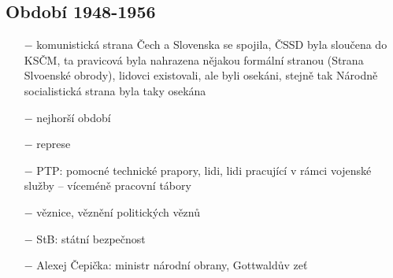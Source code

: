 \documentclass{article}
\begin{document}
\subsection*{Období 1948-1956}
\begin{itemize}
    \vspace{-0.5em}
    \setlength\itemsep{0.15em}
    \item[$-$] komunistická strana Čech a Slovenska se spojila, ČSSD byla sloučena do KSČM, ta pravicová byla nahrazena nějakou formální stranou (Strana Slvoenské obrody), lidovci existovali, ale byli osekáni, stejně tak Národně socialistická strana byla taky osekána
    \item[$-$] nejhorší období
    \item[$-$] represe
    \item[$-$] PTP: pomocné technické prapory, lidi, lidi pracující v rámci vojenské služby -- víceméně pracovní tábory
    \item[$-$] věznice, věznění politických věznů
    \item[$-$] StB: státní bezpečnost
    \item[$-$] Alexej Čepička: ministr národní obrany, Gottwaldův zeť
\end{itemize}
\end{document}
